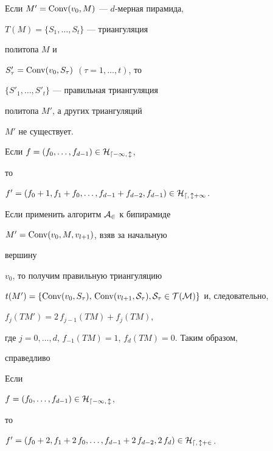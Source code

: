 \begin{lem}


Если $M'=\operatorname{Conv}(v_0,M)$ --- $d$-мерная пирамида,


$T(M)=\{S_1,\dotsc,S_t\}$ --- триангуляция


политопа $M$ и


$S'_\tau=\operatorname{Conv}(v_0,S_\tau)$ $(\tau=1,\dotsc,t)$, то


$\{S'_1,\dotsc,S'_t\}$ --- правильная триангуляция


политопа $M'$, а других триангуляций


$M'$ не существует.


\end{lem}





\begin{cor}


Если $f=(f_0,\dotsc,f_{d-1})\in\cal H_{d-1,\,l}$,


то


$f'=(f_0+1,f_1+f_0,\dotsc,f_{d-1}+f_{d-2},f_{d-1})


\in\cal H_{d,\,l+1}$.


\end{cor}





Если применить алгоритм $\cal A_2$ к бипирамиде


$M'=\operatorname{Conv}(v_0,M,v_{l+1})$, взяв за начальную


вершину


$v_0$, то получим правильную триангуляцию


$t(M')=\{\Conv(v_0,S_\tau),\,\Conv(v_{l+1},\cal S_\tau),\linebreak


\cal S_\tau\in T(M)\}$ и, следовательно,


$f_j(TM')=2\,f_{j-1}(TM)+f_j(TM)$,


где $j=0,\dotsc,d$, $f_{-1}(TM)=1$, $f_d(TM)=0$. Таким образом,


справедливо





\begin{cor}


Если


$f=(f_0,\dotsc,f_{d-1})\in\cal H_{d-1,\,l}$,


то


$f'=(f_0+2,f_1+2\,f_0,\dotsc,f_{d-1}+2\,f_{d-2},2\,f_d)


\in\cal H_{d,\,l+2}$.


\end{cor}





